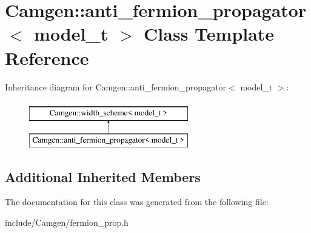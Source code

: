 \hypertarget{a00009}{\section{Camgen\-:\-:anti\-\_\-fermion\-\_\-propagator$<$ model\-\_\-t $>$ Class Template Reference}
\label{a00009}
}
Inheritance diagram for Camgen\-:\-:anti\-\_\-fermion\-\_\-propagator$<$ model\-\_\-t $>$\-:\begin{figure}[H]
\begin{center}
\leavevmode
\includegraphics[height=2.000000cm]{a00009}
\end{center}
\end{figure}
\subsection*{Additional Inherited Members}


The documentation for this class was generated from the following file\-:\begin{DoxyCompactItemize}
\item 
include/\-Camgen/fermion\-\_\-prop.\-h\end{DoxyCompactItemize}
